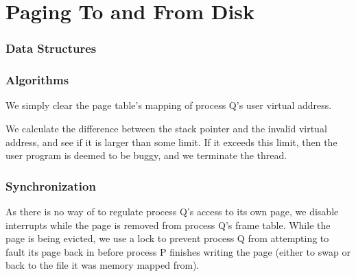\part{Paging To and From Disk}

\section{Data Structures}


\section{Algorithms}



We simply clear the page table's mapping of process Q's user virtual address.


We calculate the difference between the stack pointer and the invalid virtual
address, and see if it is larger than some limit. If it exceeds this limit, then
the user program is deemed to be buggy, and we terminate the thread.

\section{Synchronization}


As there is no way of to regulate process Q's access to its own page, we disable interrupts while the page is removed from process Q's frame table.
While the page is being evicted, we use a lock to prevent process Q from attempting to fault its page back in before process P finishes writing the page (either to swap or back to the file it was memory mapped from).

